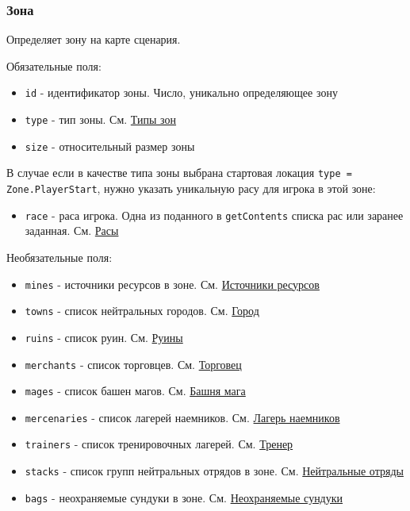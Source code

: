\subsubsection{Зона}
\label{zone}
Определяет зону на карте сценария.

Обязательные поля:
\begin{itemize}
\item \texttt{id} - идентификатор зоны. Число, уникально определяющее зону
\item \texttt{type} - тип зоны. См. \hyperref[zoneTypes]{Типы зон}
\item \texttt{size} - относительный размер зоны
\end{itemize}

В случае если в качестве типа зоны выбрана стартовая локация \texttt{type = Zone.PlayerStart}, нужно указать уникальную расу для игрока в этой зоне:
\begin{itemize}
\item \texttt{race} - раса игрока. Одна из поданного в \texttt{getContents} списка рас или заранее заданная. См. \hyperref[raceTypes]{Расы}
\end{itemize}

Необязательные поля:
\begin{itemize}
\item \texttt{mines} - источники ресурсов в зоне. См. \hyperref[crystals]{Источники ресурсов}
\item \texttt{towns} - список нейтральных городов. См. \hyperref[city]{Город}
\item \texttt{ruins} - список руин. См. \hyperref[ruin]{Руины}
\item \texttt{merchants} - список торговцев. См. \hyperref[merchant]{Торговец}
\item \texttt{mages} - список башен магов. См. \hyperref[mage]{Башня мага}
\item \texttt{mercenaries} - список лагерей наемников. См. \hyperref[mercenary]{Лагерь наемников}
\item \texttt{trainers} - список тренировочных лагерей. См. \hyperref[trainer]{Тренер}
\item \texttt{stacks} - список групп нейтральных отрядов в зоне. См. \hyperref[neutralStacks]{Нейтральные отряды}
\item \texttt{bags} - неохраняемые сундуки в зоне. См. \hyperref[bags]{Неохраняемые сундуки}
\end{itemize}

